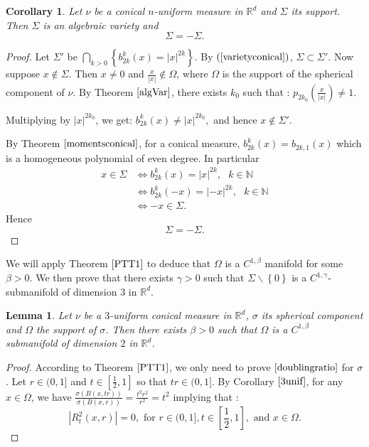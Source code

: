 \documentclass[11pt]{article}
\newtheorem{lemma}[theorem]{Lemma}
\newtheorem{corollary}[theorem]{Corollary}
\theoremstyle{definition}
\theoremstyle{remark}
\numberwithin{equation}{section}
\newcommand{\NN}{\mathbb{N}}
\begin{document}
 \begin{corollary} \label{algvarcone}
 Let $\nu$ be a conical $n$-uniform measure in $\mathbb{R}^d$ and $\Sigma$ its support. Then $\Sigma$ is an algebraic variety and \begin{equation}
 \Sigma=-\Sigma.
 \end{equation}
 \end{corollary}
 \begin{proof}
 Let $\Sigma '$ be $\bigcap_{k>0} \left\lbrace b^{k}_{2k}(x) =|x|^{2k} \right\rbrace$. By $(\ref{varietyconical})$, $\Sigma \subset \Sigma'$.
 Now suppose $x \notin \Sigma$. Then $x \neq 0$ and $\frac{x}{|x|} \notin \Omega$, where $\Omega$ is the support of the spherical component of $\nu$. By Theorem $\ref{algVar}$, there exists $k_0$ such that : $p_{2k_0}(\frac{x}{|x|})\neq 1$.
 
 Multiplying by $|x|^{2k_0}$, we get:
 $ b^{k}_{2k}(x) \neq |x|^{2k_0},$ and hence $x \notin \Sigma'$.

By Theorem $\ref{momentsconical}$, for a conical measure, $b_{2k}^{k}(x)=b_{2k,1}(x)$ which is a homogeneous polynomial of even degree. In particular
\begin{align*} x \in \Sigma & \iff b^{k}_{2k}(x) =|x|^{2k}, \mbox{ }k \in \NN \\
 & \iff b^{k}_{2k}(-x) =|-x|^{2k},\mbox{ } k \in \NN \\ & \iff -x \in \Sigma.
  \end{align*}
Hence \begin{equation} \label{coneeven}
\Sigma = -\Sigma.
\end{equation}
\end{proof}


 We will apply Theorem $\ref{PTT1}$ to deduce that $\Omega$ is a $C^{1,\beta}$ manifold for some $\beta >0$. We then prove that there exists $\gamma>0$ such that $\Sigma \backslash \left\lbrace0\right\rbrace$ is a $C^{1,\gamma}$-submanifold of dimension $3$ in $\mathbb{R}^d$.
 
 
 \begin{lemma}\label{SpherCompMan} Let $\nu$ be a $3$-uniform conical measure in $\mathbb{R}^d$, $\sigma$ its spherical component and $\Omega$ the support of $\sigma$.
 Then there exists $\beta >0$ such that $\Omega$ is a $C^{1,\beta}$ submanifold of dimension $2$ in $\mathbb{R}^d$. \end{lemma}
 
 \begin{proof} According to Theorem $\ref{PTT1}$, we only need to prove $\eqref{doublingratio}$ for $\sigma$. Let $r \in (0,1]$ and $t \in [\frac{1}{2},1]$ so that $tr \in (0,1]$. By Corollary $\ref{3unif}$, for any $x \in \Omega$, we have $\frac{\sigma(B(x,tr))}{\sigma(B(x,r))} = \frac{t^2 r^2}{r^2}=t^2$ implying that :
 $$|R^{2}_{t}(x,r)|=0, \text{ for } r \in (0,1], t \in [\frac{1}{2},1], \text{ and } x \in \Omega.$$
 \end{proof}
 
\end{document}
